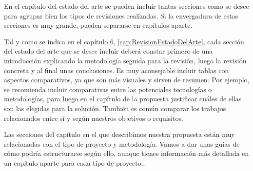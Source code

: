 En el capítulo del estado del arte se pueden incluir tantas secciones como se desee para agrupar bien los tipos de revisiones realizadas. Si la envergadura de estas secciones es muy grande, pueden separarse en capítulos aparte.

Tal y como se indica en el capítulo 6, \ref{cap:RevisionEstadoDelArte}, cada sección del estado del arte que se desee incluir deberá constar primero de una introducción explicando la metodología seguida para la revisión, luego la revisión concreta y al final unas conclusiones. Es muy aconsejable incluir tablas con aspectos comparativos, ya que son más visuales y sirven de resumen. Por ejemplo, se recomienda incluir comparativas entre las potenciales tecnologías o metodologías, para luego en el capítulo de la propuesta justificar cuáles de ellas son las elegidas para la solución. También es común comparar los trabajos relacionados entre sí y según nuestros objetivos o requisitos.

Las secciones del capítulo en el que describimos nuestra propuesta están muy relacionadas con el tipo de proyecto y metodología. Vamos a dar unas guías de cómo podría estructurarse según ello, aunque tienes información más detallada en un capítulo aparte para cada tipo de proyecto..

